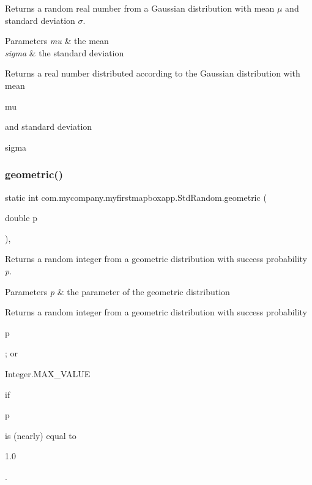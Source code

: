 Returns a random real number from a Gaussian distribution with mean {$\mu$} and standard deviation {$\sigma$}.


\begin{DoxyParams}{Parameters}
{\em mu} & the mean \\
\hline
{\em sigma} & the standard deviation \\
\hline
\end{DoxyParams}
\begin{DoxyReturn}{Returns}
a real number distributed according to the Gaussian distribution with mean
\begin{DoxyCode}
mu 
\end{DoxyCode}
 and standard deviation
\begin{DoxyCode}
sigma 
\end{DoxyCode}
 
\end{DoxyReturn}
\mbox{\label{classcom_1_1mycompany_1_1myfirstmapboxapp_1_1_std_random_a96f74a60d4b91a67b179088dd3370912}} 
\subsubsection{\texorpdfstring{geometric()}{geometric()}}
{\footnotesize\ttfamily static int com.\+mycompany.\+myfirstmapboxapp.\+Std\+Random.\+geometric (\begin{DoxyParamCaption}\item[{double}]{p }\end{DoxyParamCaption})\hspace{0.3cm}{\ttfamily [inline]}, {\ttfamily [static]}}

Returns a random integer from a geometric distribution with success probability {\itshape p}.


\begin{DoxyParams}{Parameters}
{\em p} & the parameter of the geometric distribution \\
\hline
\end{DoxyParams}
\begin{DoxyReturn}{Returns}
a random integer from a geometric distribution with success probability
\begin{DoxyCode}
p 
\end{DoxyCode}
 ; or
\begin{DoxyCode}
Integer.MAX\_VALUE 
\end{DoxyCode}
 if 
\begin{DoxyCode}
p 
\end{DoxyCode}
 is (nearly) equal to
\begin{DoxyCode}
1.0 
\end{DoxyCode}
 . 
\end{DoxyReturn}

